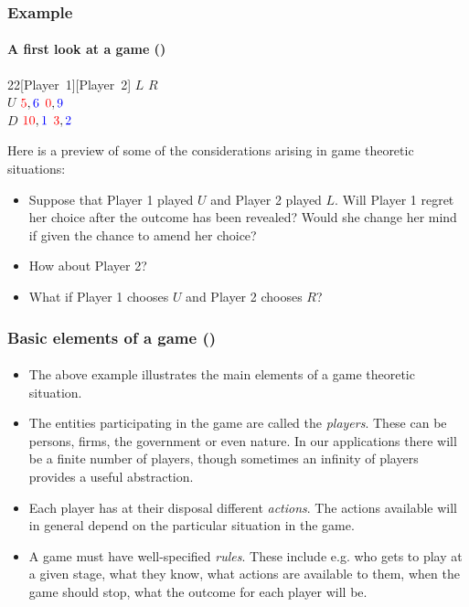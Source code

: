\documentclass[10pt]{beamer}
\theoremstyle{definition}
\begin{document}
\begin{frame}[fragile]
\frametitle{Example }
\framesubtitle{A first look at a game ()}

\begin{center}
\begin{game}{2}{2}[\color{red}Player~1][\color{blue}Player~2]
 \> {\color{blue}$ L $} \> {\color{blue}$ R $}\\
{\color{red} $ U $} \>  $ {\color{red}5},{\color{blue}6} $  \> $ {\color{red}0},{\color{blue}9} $\\
{\color{red} $ D $} \> $ {\color{red}10},{\color{blue}1} $ \> $ {\color{red}3},{\color{blue}2} $
\end{game}
\end{center}\bigskip

Here is a preview of some of the considerations arising in game theoretic situations:
\begin{itemize}\itemsep1em
\item Suppose that Player 1 played $ U $ and Player 2 played $ L $. Will Player 1 regret her choice after the outcome has been revealed? Would she change her mind if given the chance to amend her choice?
\item How about Player 2?
\item What if Player 1 chooses $ U $ and Player 2 chooses $ R $? 
\end{itemize}
\end{frame}



\begin{frame}[fragile]\setcounter{slidenum}{1}
\frametitle{Basic elements of a game ()}
\framesubtitle{}
\begin{itemize}\itemsep1em
\item The above example illustrates the main elements of a game theoretic situation.
\item The entities participating in the game are called the \emph{players}. These can be persons, firms, the government or even nature. In our applications there will be a finite number of players, though sometimes an infinity of players provides a useful abstraction.
\item Each player has at their disposal different \emph{actions}. The actions available will in general depend on the particular situation in the game.
\item A game must have well-specified \emph{rules}. These include e.g. who gets to play at a given stage, what they know, what actions are available to them, when the game should stop, what the outcome for each player will be.
\end{itemize}
\end{frame}
\end{document}

